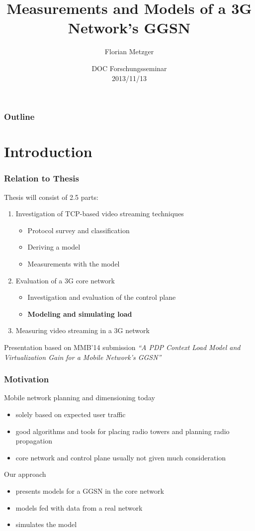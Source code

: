 \documentclass{beamer}
\title[GGSN Models]{Measurements and Models of a 3G Network's GGSN}
\author{Florian Metzger}
\institute[Unversity of Vienna]
{
	University of Vienna\\
  	Faculty of Computer Science

}
\date[Forschungsseminar WS13/14]{DOC Forschungsseminar\\ 2013/11/13}
\begin{document}
\frame{\titlepage}

\begin{frame}
	\frametitle{Outline}
	\tableofcontents
\end{frame}

\section{Introduction}

\begin{frame}
	\frametitle{Relation to Thesis}

	Thesis will consist of 2.5 parts:
	\begin{enumerate}
		\item Investigation of TCP-based video streaming techniques
			\begin{itemize}
				\item Protocol survey and classification
				\item Deriving a model
				\item Measurements with the model
			\end{itemize}
		\item Evaluation of a 3G core network
			\begin{itemize}
				\item Investigation and evaluation of the control plane
				\item \textbf{Modeling and simulating load}
			\end{itemize}
		\item Measuring video streaming in a 3G network 
	\end{enumerate}

	Presentation based on MMB'14 submission \textit{``A PDP Context Load Model and Virtualization
Gain for a Mobile Network's GGSN''}

\end{frame}

\begin{frame}
    \frametitle{Motivation}



	Mobile network planning and dimensioning today
    \begin{itemize}
    	\item solely based on expected user traffic
		\item good algorithms and tools for placing radio towers and planning radio propagation
		\item core network and control plane usually not given much consideration
	\end{itemize}

	Our approach
	\begin{itemize}
		\item presents models for a GGSN in the core network
		\item models fed with data from a real network
		\item simulates the model
	\end{itemize}

\end{frame}
\end{document}
